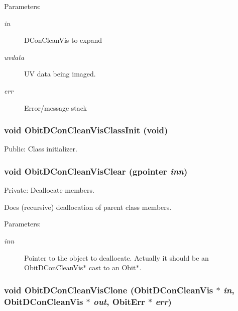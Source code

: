 \begin{Desc}
\item[Parameters:]
\begin{description}
\item[{\em in}]DCon\-Clean\-Vis to expand \item[{\em uvdata}]UV data being imaged. \item[{\em err}]Error/message stack \end{description}
\end{Desc}
\subsubsection{\setlength{\rightskip}{0pt plus 5cm}void Obit\-DCon\-Clean\-Vis\-Class\-Init (void)}\label{ObitDConCleanVis_8c_a28}


Public: Class initializer. 

\subsubsection{\setlength{\rightskip}{0pt plus 5cm}void Obit\-DCon\-Clean\-Vis\-Clear (gpointer {\em inn})}\label{ObitDConCleanVis_8c_a4}


Private: Deallocate members. 

Does (recursive) deallocation of parent class members. \begin{Desc}
\item[Parameters:]
\begin{description}
\item[{\em inn}]Pointer to the object to deallocate. Actually it should be an Obit\-DCon\-Clean\-Vis$\ast$ cast to an Obit$\ast$. \end{description}
\end{Desc}
\subsubsection{\setlength{\rightskip}{0pt plus 5cm}void Obit\-DCon\-Clean\-Vis\-Clone ({\bf Obit\-DCon\-Clean\-Vis} $\ast$ {\em in}, {\bf Obit\-DCon\-Clean\-Vis} $\ast$ {\em out}, {\bf Obit\-Err} $\ast$ {\em err})}\label{ObitDConCleanVis_8c_a15}


